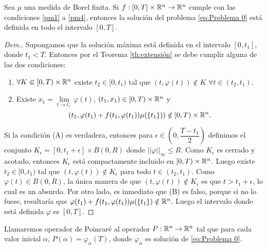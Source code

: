  
 \begin{thm}\label{th:P(T)}
 	Sea $\mu$ una medida de Borel finita.   Si $f:[0,T]\times \mathbb{R}^n\to\mathbb{R}^n$  cumple con las condiciones \ref{pm1}  a \ref{pm4},  entonces la solución del problema \eqref{eq:Problema 0} está definida en todo el intervalo $[0,T]$.
 \end{thm}
 \begin{proof}[Dem.]
 	Supongamos que la solución máxima está definida en el intervalo $[0,t_1]$, donde $t_1< T$. Entonces por el Teorema  \ref{th:extensión} se debe cumplir alguna de las dos condiciones:
 	\begin{enumerate}
 		\item[A)] 	$\forall K\Subset [0,T)\times\mathbb{R}^n$ existe $t_2\in [0,t_1)$ tal que $(t,\varphi(t))\notin K$   $\forall t\in(t_2,t_1)$. 

        \item[B)] Existe $x_1=\lim\limits_{t\to t_1^-}\varphi(t)$,  $(t_1,x_1)\in[0,T)\times\mathbb{R}^n$ y  $$\left( t_1 , \varphi(t_1)+f(t_1,\varphi(t_1))\mu(\{t_1\})\right) \notin [0,T)\times\mathbb{R}^n.$$
\end{enumerate}


   
 Si la condición (A) es verdadera, entonces para
 		$\epsilon\in\left( 0,\dfrac{T-t_1}{2}\right)$ 
    definimos el conjunto $K_{\epsilon}=[0,t_1+\epsilon]\times B(0,R)$ donde $||\varphi||_\infty\leq R$. Como $K_{\epsilon}$ es cerrado y acotado, entonces $K_{\epsilon}$ está compactamente incluido en $[0,T)\times\mathbb{R}^n$. Luego existe $t_2\in [0,t_1)$ tal que $(t,\varphi(t))\notin K_{\epsilon}$ para todo $t\in(t_2,t_1)$.  Como $\varphi(t)\in B(0,R)$, la única manera de que  $(t,\varphi(t))\notin K_{\epsilon}$ es que  $t>t_1+\epsilon$, lo cual es un absurdo. Por otro lado, es inmediato que  (B) es falso,  porque si no lo fuese, resultaría que $\varphi(t_1)+f(t_1,\varphi(t_1))\mu(\{t_1\})\notin\mathbb{R}^n$. Luego el intervalo donde está definida $\varphi$ es $[0,T]$.
 \end{proof}


\begin{defi} \label{def:op-poincare}
 Llamaremos operador de Poincaré  al operador $P:\mathbb{R}^n\to \mathbb{R}^n$ tal que para cada valor inicial $\alpha$, $P(\alpha)=\varphi_\alpha(T)$,  donde $\varphi_\alpha$ es solución de \eqref{eq:Problema 0}.
\end{defi}

